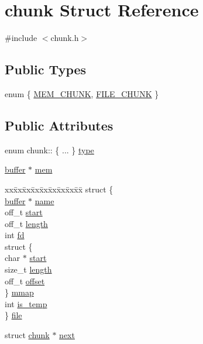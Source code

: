 \hypertarget{structchunk}{\section{chunk Struct Reference}
\label{structchunk}
}


{\ttfamily \#include $<$chunk.\-h$>$}

\subsection*{Public Types}
\begin{DoxyCompactItemize}
\item 
enum \{ \hyperlink{structchunk_a0a4cd7a7cc3e8a52c2fb512c914c7e50a372c61a9cfe36a8bb38fb8ad6e96008c}{M\-E\-M\-\_\-\-C\-H\-U\-N\-K}, 
\hyperlink{structchunk_a0a4cd7a7cc3e8a52c2fb512c914c7e50af54b3bc03a4d1ab9df03c975240e44d9}{F\-I\-L\-E\-\_\-\-C\-H\-U\-N\-K}
 \}
\end{DoxyCompactItemize}
\subsection*{Public Attributes}
\begin{DoxyCompactItemize}
\item 
enum chunk\-:: \{ ... \}  \hyperlink{structchunk_a382b377c9ed1acd324d8de01a5fc33ed}{type}
\item 
\hyperlink{structbuffer}{buffer} $\ast$ \hyperlink{structchunk_ad0664063425b63edf0890cbb8e81d150}{mem}
\item 
\begin{tabbing}
xx\=xx\=xx\=xx\=xx\=xx\=xx\=xx\=xx\=\kill
struct \{\\
\>\hyperlink{structbuffer}{buffer} $\ast$ \hyperlink{structchunk_a6db241a6c7ff77727d0f0d8ced77b2a2}{name}\\
\>off\_t \hyperlink{structchunk_a974ac929e1f3354e364ecba347170ef2}{start}\\
\>off\_t \hyperlink{structchunk_a0a2a511e083a5d1843621548e656dc91}{length}\\
\>int \hyperlink{structchunk_ac23ae6ff22ccdaddc246c15c181a5410}{fd}\\
\>struct \{\\
\>\>char $\ast$ \hyperlink{structchunk_a39e462c7efb61de24faa0c3956966399}{start}\\
\>\>size\_t \hyperlink{structchunk_a0fc193b463a06de50562ef7f9b48d453}{length}\\
\>\>off\_t \hyperlink{structchunk_a8077bd97ac50f0730fc9f9e985d185d6}{offset}\\
\>\} \hyperlink{structchunk_a77755d5fb4d7f277161089c3a0039e81}{mmap}\\
\>int \hyperlink{structchunk_aa72c09f709bc0dae2b87dcf997632a36}{is\_temp}\\
\} \hyperlink{structchunk_a377cbfc776a7513a056f49401d77234f}{file}\\

\end{tabbing}\item 
struct \hyperlink{structchunk}{chunk} $\ast$ \hyperlink{structchunk_ae1e10a6d56f2bf597d12359f5244e46a}{next}
\end{DoxyCompactItemize}


